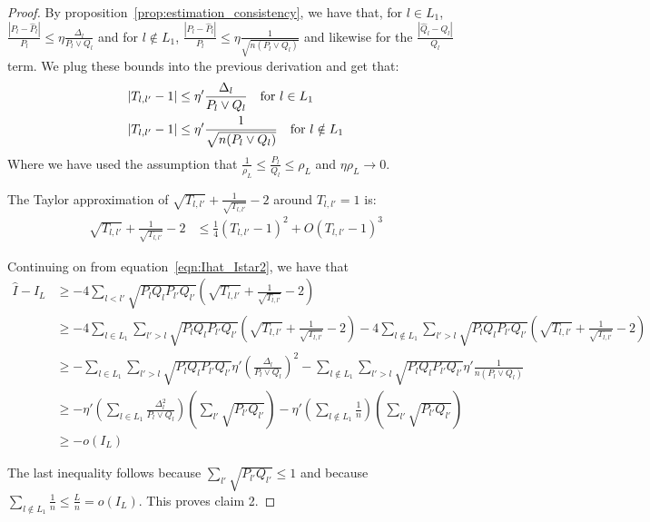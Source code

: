 \begin{proof}
By proposition~\ref{prop:estimation_consistency}, we have that, for $l \in L_1$, $\frac{|P_l - \hat{P}_l|}{P_l} \leq \eta \frac{\Delta_l}{P_l \vee Q_l}$ and for $l \notin L_1$, $\frac{|P_l - \hat{P}_l|}{P_l} \leq \eta \frac{1}{\sqrt{n (P_l \vee Q_l)}}$ and likewise for the $\frac{|\hat{Q}_l - Q_l|}{Q_l}$ term. We plug these bounds into the previous derivation and get that:
\begin{align*}
|T_{l,l'} - 1|  &\leq \eta'  \frac{\Delta_l}{P_l \vee Q_l}  \quad \textrm{for $l \in L_1$}\\
|T_{l,l'} - 1 | &\leq \eta' \frac{1}{\sqrt{ n (P_l \vee Q_l)}} \quad \textrm{for $l \notin L_1$}
\end{align*}
Where we have used the assumption that $\frac{1}{\rho_L} \leq \frac{P_l}{Q_l} \leq \rho_L$ and $\eta \rho_L \rightarrow 0$. 


The Taylor approximation of $\sqrt{T_{l,l'}} + \frac{1}{\sqrt{T_{l,l'}}} - 2$ around $T_{l,l'}=1$ is:
\begin{align*}
\sqrt{T_{l,l'}} + \frac{1}{\sqrt{T_{l,l'}}} -2  &\leq 
  \frac{1}{4} (T_{l,l'} - 1)^2 + O (T_{l,l'}-1)^3 
\end{align*}

Continuing on from equation~\ref{eqn:Ihat_Istar2}, we have that
\begin{align*}
\hat{I} - I_L &\geq - 4 \sum_{l < l'} \sqrt{P_l Q_l P_{l'} Q_{l'}} 
    \left( \sqrt{T_{l,l'}} + \frac{1}{\sqrt{T_{l,l'}}} - 2 \right) \\
&\geq - 4 \sum_{l \in L_1} \sum_{l' > l} \sqrt{P_l Q_l P_{l'} Q_{l'}} 
    \left( \sqrt{T_{l,l'}} + \frac{1}{\sqrt{T_{l,l'}}} - 2 \right) 
     - 4 \sum_{l \notin L_1} \sum_{l' > l} \sqrt{P_l Q_l P_{l'} Q_{l'}} 
    \left( \sqrt{T_{l,l'}} + \frac{1}{\sqrt{T_{l,l'}}} - 2 \right) \\
  &\geq - \sum_{l \in L_1} \sum_{l' > l} \sqrt{P_l Q_l P_{l'} Q_{l'}} 
             \eta' \left( \frac{\Delta_l}{P_l \vee Q_l}  \right)^2 
        - \sum_{l \notin L_1} \sum_{l' > l} \sqrt{P_l Q_l P_{l'} Q_{l'}} 
             \eta' \frac{1}{n (P_l \vee Q_l)} \\
 &\geq - \eta' \left( \sum_{l \in L_1} \frac{\Delta_l^2}{P_l \vee Q_l} \right)
         \left( \sum_{l'}  \sqrt{P_{l'}Q_{l'}} \right) 
       - \eta' \left( \sum_{l \notin L_1} \frac{1}{n} \right) 
          \left( \sum_{l'} \sqrt{P_{l'} Q_{l'} } \right) \\
 &\geq - o(I_L)
\end{align*}

The last inequality follows because $\sum_{l'} \sqrt{P_{l'} Q_{l'}} \leq 1$ and because $\sum_{l \notin L_1} \frac{1}{n} \leq \frac{L}{n} = o(I_L)$. This proves claim 2.


\end{proof}
